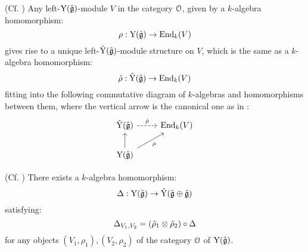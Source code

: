         \begin{lemma} \label{lemma: lifting_representations_of_affine_yangians_to_root_grading_completions}
            (Cf. \cite[Proposition 5.14]{guay_nakajima_wendlandt_affine_yangian_coproduct}) Any left-$\mathrm{Y}(\hat{\mathfrak{g}})$-module $V$ in the category $\mathcal{O}$, given by a $k$-algebra homomorphism:
                $$\rho: \mathrm{Y}(\hat{\mathfrak{g}}) \to \mathrm{End}_k(V)$$
            gives rise to a unique left-$\hat{\mathrm{Y}}(\hat{\mathfrak{g}})$-module structure on $V$, which is the same as a $k$-algebra homomorphism:
                $$\hat{\rho}: \hat{\mathrm{Y}}(\hat{\mathfrak{g}}) \to \mathrm{End}_k(V)$$
            fitting into the following commutative diagram of $k$-algebras and homomorphisms between them, where the vertical arrow is the canonical one as in \cite[Section 5, Lemma 5.3]{guay_nakajima_wendlandt_affine_yangian_coproduct}:
                $$
                    \begin{tikzcd}
                	{\hat{\rmY}(\hat{\g})} & {\End_k(V)} \\
                	{\rmY(\hat{\g})}
                	\arrow[from=2-1, to=1-1]
                	\arrow["{\hat{\rho}}", dashed, from=1-1, to=1-2]
                	\arrow["\rho"', from=2-1, to=1-2]
                    \end{tikzcd}
                $$
        \end{lemma}
        \begin{proposition} \label{prop: hopf_coproduct_on_yangians}
            (Cf. \cite[Proposition 5.18]{guay_nakajima_wendlandt_affine_yangian_coproduct}) There exists a $k$-algebra homomorphism:
                $$\Delta: \mathrm{Y}(\hat{\mathfrak{g}}) \to \hat{\mathrm{Y}}(\hat{\mathfrak{g}} \oplus \hat{\mathfrak{g}})$$
            satisfying:
                $$\Delta_{V_1, V_2} = (\hat{\rho}_1 \tensor \hat{\rho}_2) \circ \Delta$$
            for any objects $(V_1, \rho_1), (V_2, \rho_2)$ of the category $\mathcal{O}$ of $\mathrm{Y}(\hat{\mathfrak{g}})$.
        \end{proposition}
        
